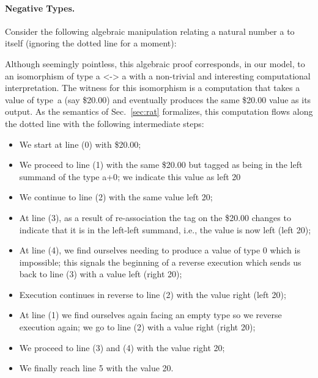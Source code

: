 \documentclass[preprint]{sigplanconf}
\begin{document}
\paragraph*{Negative Types.} 
Consider the following algebraic manipulation relating a natural number {{a}}
to itself (ignoring the dotted line for a moment):
\begin{center}
\end{center}
Although seemingly pointless, this algebraic proof corresponds, in our model,
to an isomorphism of type {{a <-> a}} with a non-trivial and interesting
computational interpretation. The witness for this isomorphism is a
computation that takes a value of type~{{a}} (say \$20.00) and eventually
produces the same \$20.00 value as its output. As the semantics of
Sec.~\ref{sec:rat} formalizes, this computation flows along the dotted
line with the following intermediate steps:
\begin{itemize}
\item We start at line (0) with \$20.00; 
\item We proceed to line (1) with the same \$20.00 but tagged as being in the
  left summand of the type {{a+0}}; we indicate this value as {{left 20}}
\item We continue to line (2) with the same value {{left 20}};
\item At line (3), as a result of re-association the tag on the \$20.00
  changes to indicate that it is in the left-left summand, i.e., the value is
  now {{left (left 20)}};
\item At line (4), we find ourselves needing to produce a value of type 0
  which is impossible; this signals the beginning of a reverse execution
  which sends us back to line (3) with a value {{left (right 20)}};
\item Execution continues in reverse to line (2) with the value 
  {{right (left 20)}};
\item At line (1) we find ourselves again facing an empty type so we reverse
  execution again; we go to line (2) with a value {{right (right 20)}};
\item We proceed to line (3) and (4) with the value {{right 20}};
\item We finally reach line 5 with the value {{20}}.
\end{itemize}
\end{document}
